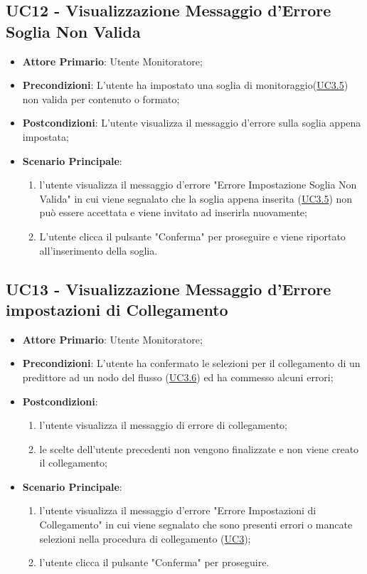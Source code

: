 
		\label{par:UC12}
	\subsection{UC12 - Visualizzazione Messaggio d'Errore Soglia Non Valida}
		\begin{itemize}
			\item\textbf{Attore Primario}: Utente Monitoratore;
			\item\textbf{Precondizioni}: L’utente ha impostato una soglia di monitoraggio(\hyperref[par:UC3.5]{UC3.5}) non valida per contenuto o formato;
			\item\textbf{Postcondizioni}: L’utente visualizza il messaggio d'errore sulla soglia appena impostata;		
			\item\textbf{Scenario Principale}: 
				\begin{enumerate} 
					\item l’utente visualizza il messaggio d'errore "Errore Impostazione Soglia Non Valida" in cui viene segnalato che la soglia appena inserita (\hyperref[par:UC3.5]{UC3.5}) non può essere accettata e viene invitato ad inserirla nuovamente;
					\item L'utente clicca il pulsante "Conferma" per proseguire e viene riportato all'inserimento della soglia.		
				\end{enumerate}		
		\end{itemize}


	\label{par:UC13}
	\subsection{UC13 - Visualizzazione Messaggio d'Errore impostazioni di Collegamento}
		\begin{itemize}
			\item\textbf{Attore Primario}: Utente Monitoratore;
			\item\textbf{Precondizioni}: L’utente ha confermato le selezioni per il collegamento di un predittore ad un nodo del flusso (\hyperref[par:UC3.6]{UC3.6}) ed ha commesso alcuni errori;
			\item\textbf{Postcondizioni}: 
				\begin{enumerate}
					\item l’utente visualizza il messaggio di errore di collegamento;
					\item le scelte dell'utente precedenti non vengono finalizzate e non viene creato il collegamento; 
				\end{enumerate}		
			\item\textbf{Scenario Principale}: 
				\begin{enumerate} 
					\item l’utente visualizza il messaggio d'errore "Errore Impostazioni di Collegamento" in cui viene segnalato che sono presenti errori o mancate selezioni nella procedura di collegamento (\hyperref[par:UC3]{UC3});
					\item l'utente clicca il pulsante "Conferma" per proseguire.		
				\end{enumerate}		
		\end{itemize}

